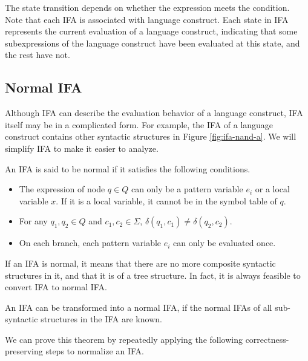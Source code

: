 The state transition depends on whether the expression meets the condition. Note that each IFA is associated with language construct. Each state in IFA represents the current evaluation of a language construct, indicating that some subexpressions of the language construct have been evaluated at this state, and the rest have not.

\subsection{Normal IFA}

Although IFA can describe the evaluation behavior of a language construct, IFA itself may be in a complicated form. For example, the IFA of a language construct contains other syntactic structures in Figure \ref{fig:ifa-nand-a}. We will simplify IFA to make it easier to analyze.

\begin{Def}
    \label{def:nmlifa}
    An IFA is said to be normal if it satisfies the following conditions.
    \begin{itemize}
        \item The expression of node $q \in Q$ can only be a pattern variable $e_i$ or a local variable $x$. If it is a local variable, it cannot be in the symbol table of $q$.
        \item For any $q_1,q_2 \in Q$ and $c_1, c_2 \in \Sigma$, $\delta(q_1, c_1) \neq \delta(q_2, c_2)$.
        \item On each branch, each pattern variable $e_i$ can only be evaluated once.
    \end{itemize}
\end{Def}

If an IFA is normal, it means that there are no more composite syntactic structures in it, and that it is of a tree structure.
In fact, it is always feasible to convert IFA to normal IFA.

\begin{mythm}
    \label{mythm:nmlifa}
    An IFA can be transformed into a normal IFA, if the normal IFAs of all sub-syntactic structures in the IFA are known.
\end{mythm}

We can prove this theorem by repeatedly applying the following correctness-preserving steps to normalize an IFA.

